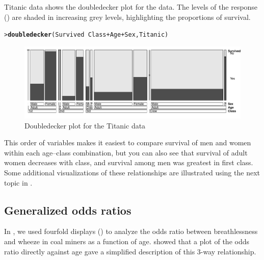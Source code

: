 \documentclass[10pt,krantz2]{krantz}\usepackage[]{graphicx}\usepackage[]{color}
\makeatletter
\newcommand{\hlopt}[1]{\textcolor[rgb]{0,0,0}{#1}}%
\newcommand{\hlstd}[1]{\textcolor[rgb]{0.345,0.345,0.345}{#1}}%
\newcommand{\hlkwd}[1]{\textcolor[rgb]{0.737,0.353,0.396}{\textbf{#1}}}%
\newenvironment{kframe}{%
 \def\at@end@of@kframe{}%
 \ifinner\ifhmode%
  \def\at@end@of@kframe{\end{minipage}}%
  \begin{minipage}{\columnwidth}%
 \fi\fi%
 \def\FrameCommand##1{\hskip\@totalleftmargin \hskip-\fboxsep
 \colorbox{shadecolor}{##1}\hskip-\fboxsep
     \hskip-\linewidth \hskip-\@totalleftmargin \hskip\columnwidth}%
 \MakeFramed {\advance\hsize-\width
   \@totalleftmargin\z@ \linewidth\hsize
   \@setminipage}}%
 {\par\unskip\endMakeFramed%
 \at@end@of@kframe}
\newenvironment{knitrout}{}{} %
\renewenvironment{knitrout}{\small\renewcommand{\baselinestretch}{.85}}{} %
\makeatother
\begin{document}
\begin{Example}{Titanic data}
 shows the doubledecker plot for the  data. The 
levels of the response () are shaded in increasing grey levels, highlighting the
proportions of survival.
\begin{knitrout}
\color{fgcolor}\begin{kframe}
\begin{alltt}
\hlstd{> }\hlkwd{doubledecker}\hlstd{(Survived} \hlopt{~} \hlstd{Class} \hlopt{+} \hlstd{Age} \hlopt{+} \hlstd{Sex, Titanic)}
\end{alltt}
\end{kframe}\begin{figure}[!htbp]

\centerline{\includegraphics[width=\textwidth]{ch05/fig/titanic-doubledecker-1} }

\caption[Doubledecker plot for the Titanic data]{Doubledecker plot for the Titanic data\label{fig:titanic-doubledecker}}
\end{figure}


\end{knitrout}
This order of variables makes it easiest to compare survival of men and women within each age--class combination,
but you can also see that survival of adult women decreases with class, and survival among men was greatest
in first class.  Some additional visualizations of these relationships are illustrated using the
next topic in .

\end{Example}

\subsection{Generalized odds ratios}\label{sec:oddsratio}

In , we used fourfold displays () to analyze the odds ratio between
breathlessness and wheeze in coal miners as a function of age.  
 showed that a plot of the odds ratio directly against age
gave a simplified description of this 3-way relationship.
\end{document}
